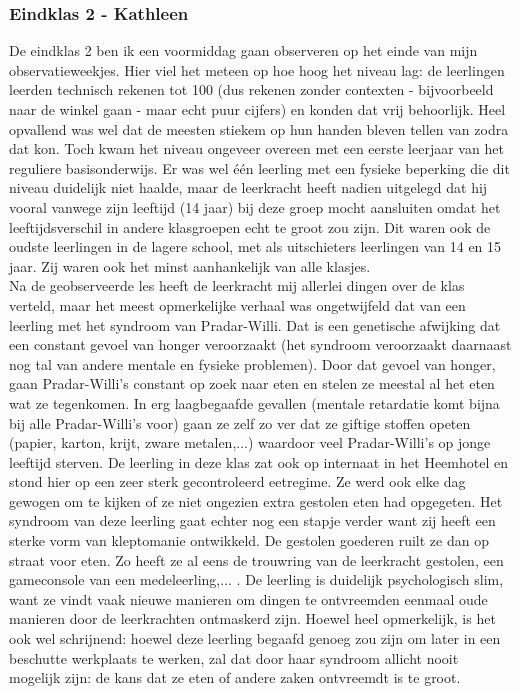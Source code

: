 \documentclass[a4paper,11pt]{article}
\theoremstyle{definition}
\begin{document}
\subsubsection{Eindklas 2 - Kathleen}
De eindklas 2 ben ik een voormiddag gaan observeren op het einde van mijn observatieweekjes. 
Hier viel het meteen op hoe hoog het niveau lag: de leerlingen leerden technisch 
rekenen tot 100 (dus rekenen zonder contexten - bijvoorbeeld naar de winkel gaan - maar echt puur cijfers) 
en konden dat vrij behoorlijk. Heel opvallend was wel dat de meesten stiekem op 
hun handen bleven tellen van zodra dat kon. Toch kwam het niveau ongeveer overeen met een eerste leerjaar van het reguliere basisonderwijs. 
Er was wel één leerling met een fysieke beperking die dit niveau duidelijk niet 
haalde, maar de leerkracht heeft nadien uitgelegd dat hij vooral vanwege zijn 
leeftijd (14 jaar) bij deze groep mocht aansluiten omdat het leeftijdsverschil 
in andere klasgroepen echt te groot zou zijn.
Dit waren ook de oudste leerlingen in de lagere school, met als uitschieters
leerlingen van 14 en 15 jaar. Zij waren ook het minst aanhankelijk van alle klasjes.\\

\noindent Na de geobserveerde les heeft de leerkracht mij allerlei dingen over de klas 
verteld, maar het meest opmerkelijke verhaal was ongetwijfeld dat van een 
leerling met het syndroom van Pradar-Willi. Dat is een genetische afwijking 
dat een constant gevoel van honger veroorzaakt (het syndroom veroorzaakt daarnaast nog tal van andere mentale en fysieke 
problemen). Door dat gevoel van honger, gaan Pradar-Willi's constant op zoek 
naar eten en stelen ze meestal al het eten wat ze tegenkomen. In erg laagbegaafde gevallen (mentale retardatie komt bijna bij alle Pradar-Willi's voor) gaan ze zelf
zo ver dat ze giftige stoffen opeten (papier, karton, krijt, zware metalen,...) waardoor veel Pradar-Willi's op jonge leeftijd sterven. De leerling in 
deze klas zat ook op internaat in het Heemhotel en stond hier op een zeer sterk gecontroleerd eetregime. Ze werd ook elke dag gewogen om te 
kijken of ze niet ongezien extra gestolen eten had opgegeten. Het syndroom van 
deze leerling gaat echter nog een stapje verder want zij heeft een sterke vorm 
van kleptomanie ontwikkeld. De gestolen goederen ruilt ze dan op straat voor eten. Zo heeft ze al eens de trouwring van de leerkracht 
gestolen, een gameconsole van een medeleerling,... . De leerling is duidelijk 
psychologisch slim, want ze vindt vaak nieuwe manieren om dingen te ontvreemden eenmaal oude manieren door de 
leerkrachten ontmaskerd zijn. Hoewel heel opmerkelijk, 
is het ook wel schrijnend: hoewel deze leerling begaafd genoeg zou zijn om later 
in een beschutte werkplaats te werken, zal dat door haar syndroom allicht nooit 
mogelijk zijn: de kans dat ze eten of andere zaken ontvreemdt is te groot.
\end{document}
